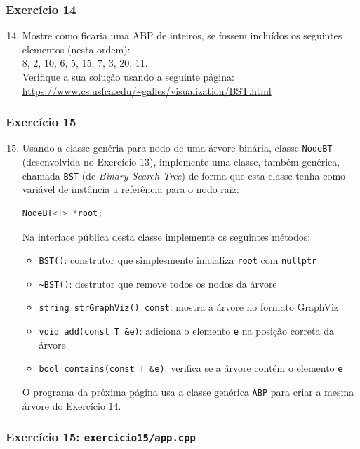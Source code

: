 \documentclass[aspectratio=169]{beamer}
\begin{document}
\begin{frame}[fragile]\frametitle{Exercício 14}
\begin{enumerate}
	\setcounter{enumi}{13}
	\item Mostre como ficaria uma ABP de inteiros, se fossem incluídos os seguintes elementos (nesta ordem):\\8, 2, 10, 6, 5, 15, 7, 3, 20, 11.\\
Verifique a sua solução usando a seguinte página: \url{https://www.cs.usfca.edu/~galles/visualization/BST.html}
\end{enumerate}
\end{frame}

\begin{frame}[fragile]\frametitle{Exercício 15}
\begin{enumerate}
	\setcounter{enumi}{14}
	\item Usando a classe genéria para nodo de uma árvore binária, classe \texttt{NodeBT} (desenvolvida no Exercício 13), implemente uma classe, também genérica, chamada \texttt{BST} (de \emph{Binary Search Tree}) de forma que esta classe tenha como variável de instância a referência para o nodo raiz:
\begin{lstlisting}[language=C++,basicstyle=\ttfamily\tiny]
NodeBT<T> *root;
\end{lstlisting}
Na interface pública desta classe implemente os seguintes métodos:
	\begin{itemize}
		\item \texttt{BST()}: construtor que simplesmente inicializa \texttt{root} com \texttt{nullptr}
		\item \texttt{\~{}BST()}: destrutor que remove todos os nodos da árvore
		\item \texttt{string strGraphViz() const}: mostra a árvore no formato GraphViz
		\item \texttt{void add(const T \&e)}: adiciona o elemento \texttt{e} na posição correta da árvore
		\item \texttt{bool contains(const T \&e)}: verifica se a árvore contém o elemento \texttt{e}
	\end{itemize}
O programa da próxima página usa a classe genérica \texttt{ABP} para criar a mesma árvore do Exercício 14.
\end{enumerate}
\end{frame}

\begin{frame}[fragile]\frametitle{Exercício 15: \texttt{exercicio15/app.cpp}}

\end{frame}
\end{document}
